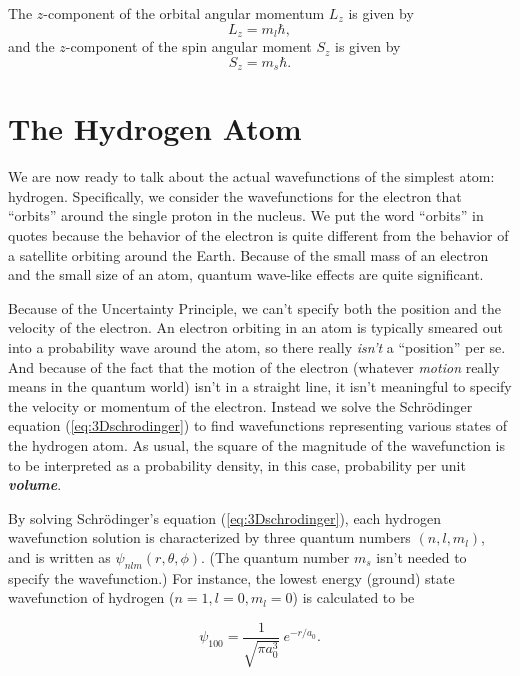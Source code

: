 The $z$-component of the orbital angular momentum $L_z$ is
given by
\begin{equation}
\label{eq:Lcomponent}
L_z = m_l \hbar  ,
\end{equation}
and the $z$-component of the spin angular moment $S_z$ is given by
\begin{equation}
\label{eq:Scomponent}
S_z = m_s \hbar .
\end{equation}

\section{The Hydrogen Atom}
\label{sec:hydrogen_atom}

We are now ready to talk about the actual wavefunctions of the
simplest atom: hydrogen.  Specifically, we consider the wavefunctions
for the electron that ``orbits'' around the single proton in the
nucleus.  We put the word ``orbits'' in quotes because the behavior of
the electron is quite different from the behavior of a satellite
orbiting around the Earth. Because of the small mass of an electron
and the small size of an atom, quantum wave-like effects are quite
significant.

Because of the Uncertainty Principle, we can't specify both the
position and the velocity of the electron. An electron orbiting in an
atom is typically smeared out into a probability wave around the atom,
so there really {\it isn't\/} a ``position'' per se.  And because of
the fact that the motion of the electron (whatever {\it motion\/}
really means in the quantum world) isn't in a straight line, it isn't
meaningful to specify the velocity or momentum of the
electron. Instead we solve the Schr\"{o}dinger equation
(\ref{eq:3Dschrodinger}) to find wavefunctions representing various
states of the hydrogen atom.  As usual, the square of the magnitude of
the wavefunction is to be interpreted as a probability density, in
this case, probability per unit {\bf {\em volume}}.

By solving Schr\"{o}dinger's equation (\ref{eq:3Dschrodinger}), each
hydrogen wavefunction solution is characterized by three quantum
numbers $\left(n, l, m_l\right)$, and is written as
$\psi_{nlm}(r,\theta,\phi)$.  (The quantum number $m_s$ isn't needed
to specify the wavefunction.)  For instance, the lowest energy
(ground) state wavefunction of hydrogen ($n=1, l=0, m_l=0$) is
calculated to be

\begin{equation}
\psi_{100} = \frac{1}{\sqrt{\pi a_0^3}}\ e^{-r/a_0} .
\label{eq:H100}
\end{equation}

